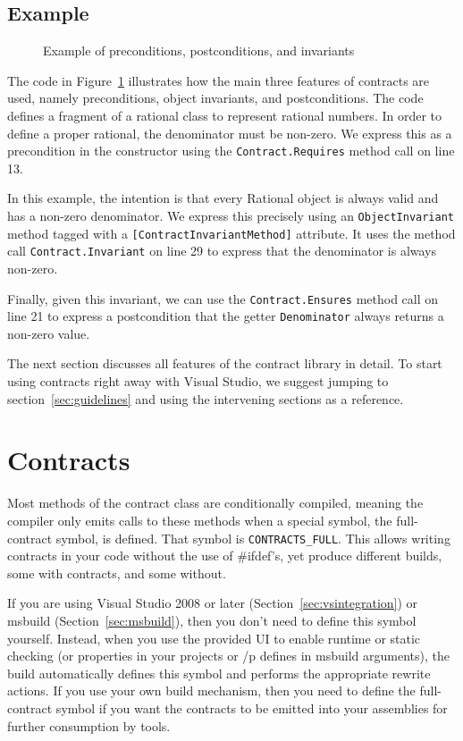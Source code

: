 \documentclass{article}
\newcommand{\code}[1]{\lstinline{#1}}
\begin{document}
\subsection{Example}

\begin{figure}[bt!]
\small

\caption{Example of preconditions, postconditions, and invariants}
\label{fig:rational-example1}
\end{figure}

The code in Figure~\ref{fig:rational-example1} illustrates how the
main three features of contracts are used, namely preconditions,
object invariants, and postconditions. The code defines a fragment of
a rational class to represent rational numbers.  In order to define a
proper rational, the denominator must be non-zero. We express this as
a precondition in the constructor using the
\code{Contract.Requires} method call on line 13.

In this example, the intention is that every Rational object is always
valid and has a non-zero denominator. We express this precisely using an
\code{ObjectInvariant} method tagged with a
\code{[ContractInvariantMethod]} attribute. It uses the method call
\code{Contract.Invariant} on line 29 to express that the
denominator is always non-zero.

Finally, given this invariant, we can use the
\code{Contract.Ensures} method call on line 21 to express a
postcondition that the getter \code{Denominator} always returns a
non-zero value.

The next section discusses all features of the contract library in
detail. To start using contracts right away with Visual Studio, we
suggest jumping to section~\ref{sec:guidelines} and using the
intervening sections as a reference.

\section{Contracts}
\label{sec:contracts}
Most methods of the contract class are conditionally compiled,
meaning the compiler only emits calls to these methods when a special
symbol, the full-contract symbol, is defined. That symbol is
\code{CONTRACTS_FULL}. This allows writing contracts in your code
without the use of \#ifdef's, yet produce different builds, some with
contracts, and some without.

If you are using Visual Studio 2008 or later
(Section~\ref{sec:vsintegration}) or msbuild
(Section~\ref{sec:msbuild}), then you don't need to define this symbol
yourself. Instead, when you use the provided UI to enable runtime or
static checking (or properties in your projects or /p defines in
msbuild arguments), the build automatically defines this symbol and
performs the appropriate rewrite actions. If you use your own build
mechanism, then you need to define the full-contract symbol if you
want the contracts to be emitted into your assemblies for further
consumption by tools.
\end{document}
